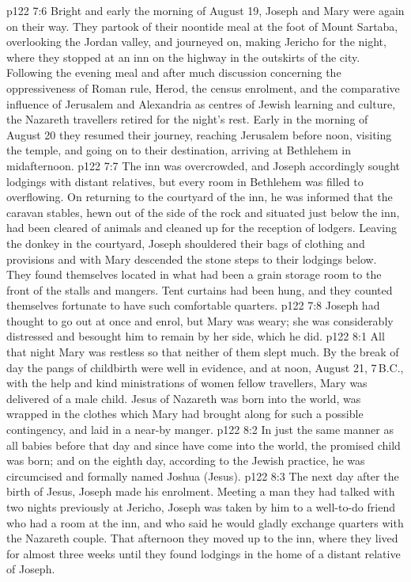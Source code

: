 \vs p122 7:6 Bright and early the morning of August 19, Joseph and Mary were again on their way. They partook of their noontide meal at the foot of Mount Sartaba, overlooking the Jordan valley, and journeyed on, making Jericho for the night, where they stopped at an inn on the highway in the outskirts of the city. Following the evening meal and after much discussion concerning the oppressiveness of Roman rule, Herod, the census enrolment, and the comparative influence of Jerusalem and Alexandria as centres of Jewish learning and culture, the Nazareth travellers retired for the night’s rest. Early in the morning of August 20 they resumed their journey, reaching Jerusalem before noon, visiting the temple, and going on to their destination, arriving at Bethlehem in midafternoon.
\vs p122 7:7 The inn was overcrowded, and Joseph accordingly sought lodgings with distant relatives, but every room in Bethlehem was filled to overflowing. On returning to the courtyard of the inn, he was informed that the caravan stables, hewn out of the side of the rock and situated just below the inn, had been cleared of animals and cleaned up for the reception of lodgers. Leaving the donkey in the courtyard, Joseph shouldered their bags of clothing and provisions and with Mary descended the stone steps to their lodgings below. They found themselves located in what had been a grain storage room to the front of the stalls and mangers. Tent curtains had been hung, and they counted themselves fortunate to have such comfortable quarters.
\vs p122 7:8 Joseph had thought to go out at once and enrol, but Mary was weary; she was considerably distressed and besought him to remain by her side, which he did.
\vs p122 8:1 All that night Mary was restless so that neither of them slept much. By the break of day the pangs of childbirth were well in evidence, and at noon, August 21, 7\,B.C., with the help and kind ministrations of women fellow travellers, Mary was delivered of a male child. Jesus of Nazareth was born into the world, was wrapped in the clothes which Mary had brought along for such a possible contingency, and laid in a near\hyp{}by manger.
\vs p122 8:2 In just the same manner as all babies before that day and since have come into the world, the promised child was born; and on the eighth day, according to the Jewish practice, he was circumcised and formally named Joshua (Jesus).
\vs p122 8:3 The next day after the birth of Jesus, Joseph made his enrolment. Meeting a man they had talked with two nights previously at Jericho, Joseph was taken by him to a well\hyp{}to\hyp{}do friend who had a room at the inn, and who said he would gladly exchange quarters with the Nazareth couple. That afternoon they moved up to the inn, where they lived for almost three weeks until they found lodgings in the home of a distant relative of Joseph.
